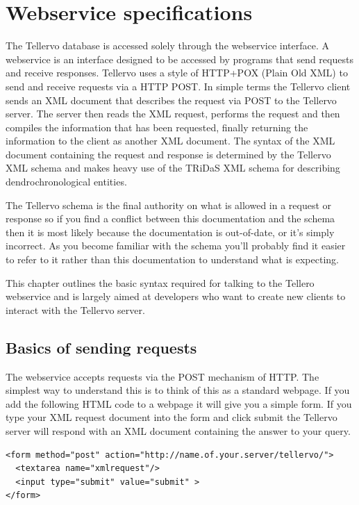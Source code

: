 \chapter{Webservice specifications}
\label{txt:webserviceSpec}

The Tellervo database is accessed solely through the webservice interface.  A webservice is an interface designed to be accessed by programs that send requests and receive responses.  Tellervo uses a style of HTTP+POX (Plain Old XML) to send and receive requests via a HTTP POST.  In simple terms the Tellervo client sends an XML document that describes the request via POST to the Tellervo server.  The server then reads the XML request, performs the request and then compiles the information that has been requested, finally returning the information to the client as another XML document.  The syntax of the XML document containing the request and response is determined by the Tellervo XML schema and makes heavy use of the TRiDaS XML schema for describing dendrochronological entities.

The Tellervo schema is the final authority on what is allowed in a request or response so if you find a conflict between this documentation and the schema then it is most likely because the documentation is out-of-date, or it's simply incorrect.  As you become familiar with the schema you'll probably find it easier to refer to it rather than this documentation to understand what is expecting.

This chapter outlines the basic syntax required for talking to the Tellero webservice and is largely aimed at developers who want to create new clients to interact with the Tellervo server.

\section{Basics of sending requests}
The webservice accepts requests via the POST mechanism of HTTP.  The simplest way to understand this is to think of this as a standard webpage.  If you add the following HTML code to a webpage it will give you a simple form.  If you type your XML request document into the form and click submit the Tellervo server will respond with an XML document containing the answer to your query.

\begin{lstlisting}
<form method="post" action="http://name.of.your.server/tellervo/">
  <textarea name="xmlrequest"/>
  <input type="submit" value="submit" >
</form>
\end{lstlisting}

